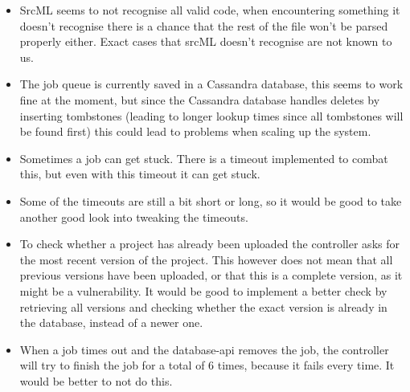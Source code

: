 \documentclass[./Main.tex]{subfiles}
\begin{document}
\begin{itemize}
    \item SrcML seems to not recognise all valid code, when encountering something it doesn't recognise there is a chance that the rest of the file won't be parsed properly either. Exact cases that srcML doesn't recognise are not known to us.
    \item The job queue is currently saved in a Cassandra database, this seems to work fine at the moment, but since the Cassandra database handles deletes by inserting tombstones (leading to longer lookup times since all tombstones will be found first) this could lead to problems when scaling up the system.
    \item Sometimes a job can get stuck. There is a timeout implemented to combat this, but even with this timeout it can get stuck.
    \item Some of the timeouts are still a bit short or long, so it would be good to take another good look into tweaking the timeouts.
    \item To check whether a project has already been uploaded the controller asks for the most recent version of the project. This however does not mean that all previous versions have been uploaded, or that this is a complete version, as it might be a vulnerability. It would be good to implement a better check by retrieving all versions and checking whether the exact version is already in the database, instead of a newer one.
    \item When a job times out and the database-api removes the job, the controller will try to finish the job for a total of 6 times, because it fails every time. It would be better to not do this.
\end{itemize}
\end{document}
